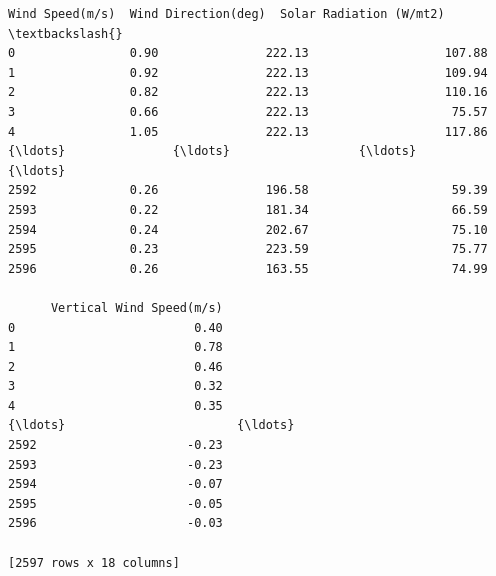 \documentclass[11pt]{article}
\begin{document}
\begin{tcolorbox}[breakable, size=fbox, boxrule=.5pt, pad at break*=1mm, opacityfill=0]
\begin{Verbatim}[commandchars=\\\{\}]
      Wind Speed(m/s)  Wind Direction(deg)  Solar Radiation (W/mt2)  \textbackslash{}
0                0.90               222.13                   107.88
1                0.92               222.13                   109.94
2                0.82               222.13                   110.16
3                0.66               222.13                    75.57
4                1.05               222.13                   117.86
{\ldots}               {\ldots}                  {\ldots}                      {\ldots}
2592             0.26               196.58                    59.39
2593             0.22               181.34                    66.59
2594             0.24               202.67                    75.10
2595             0.23               223.59                    75.77
2596             0.26               163.55                    74.99

      Vertical Wind Speed(m/s)
0                         0.40
1                         0.78
2                         0.46
3                         0.32
4                         0.35
{\ldots}                        {\ldots}
2592                     -0.23
2593                     -0.23
2594                     -0.07
2595                     -0.05
2596                     -0.03

[2597 rows x 18 columns]
\end{Verbatim}
\end{tcolorbox}
        
\end{document}
